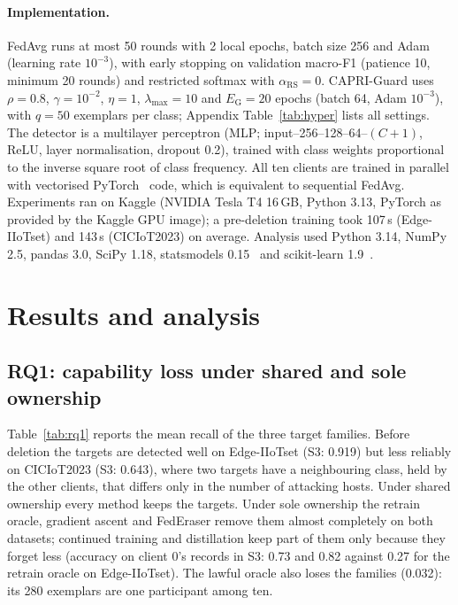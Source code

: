 \documentclass[pdflatex,sn-mathphys-num,iicol]{sn-jnl}
\begin{document}
\paragraph{Implementation.} FedAvg runs at most 50 rounds with 2 local epochs, batch size 256 and Adam (learning rate $10^{-3}$), with early stopping on validation macro-F1 (patience 10, minimum 20 rounds) and restricted softmax with $\alpha_{\mathrm{RS}}=0$. CAPRI-Guard uses $\rho=0.8$, $\gamma=10^{-2}$, $\eta=1$, $\lambda_{\max}=10$ and $E_{\mathrm{G}}=20$ epochs (batch 64, Adam $10^{-3}$), with $q=50$ exemplars per class; Appendix Table~\ref{tab:hyper} lists all settings. The detector is a multilayer perceptron (MLP; input--256--128--64--$(C+1)$, ReLU, layer normalisation, dropout 0.2), trained with class weights proportional to the inverse square root of class frequency. All ten clients are trained in parallel with vectorised PyTorch~\cite{paszke2019} code, which is equivalent to sequential FedAvg. Experiments ran on Kaggle (NVIDIA Tesla T4 16\,GB, Python 3.13, PyTorch as provided by the Kaggle GPU image); a pre-deletion training took 107\,s (Edge-IIoTset) and 143\,s (CICIoT2023) on average. Analysis used Python 3.14, NumPy 2.5, pandas 3.0, SciPy 1.18, statsmodels 0.15~\cite{seabold2010} and scikit-learn 1.9~\cite{pedregosa2011}.



\section{Results and analysis}\label{sec:results}

\subsection{RQ1: capability loss under shared and sole ownership}\label{sec:res-rq1}

Table~\ref{tab:rq1} reports the mean recall of the three target families. Before deletion the targets are detected well on Edge-IIoTset (S3: 0.919) but less reliably on CICIoT2023 (S3: 0.643), where two targets have a neighbouring class, held by the other clients, that differs only in the number of attacking hosts. Under shared ownership every method keeps the targets. Under sole ownership the retrain oracle, gradient ascent and FedEraser remove them almost completely on both datasets; continued training and distillation keep part of them only because they forget less (accuracy on client 0's records in S3: 0.73 and 0.82 against 0.27 for the retrain oracle on Edge-IIoTset). The lawful oracle also loses the families (0.032): its 280 exemplars are one participant among ten.
\end{document}
